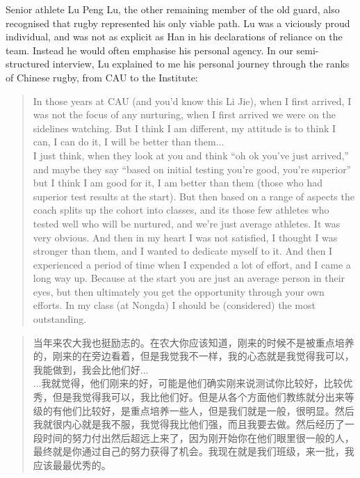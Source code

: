 \begin{CJK}{UTF8}{gbsn}
Senior athlete Lu Peng Lu, the other remaining member of the old guard, also recognised that rugby represented his only viable path. Lu was a viciously proud individual, and was not as explicit as Han in his declarations of reliance on the team. Instead he would often emphasise his personal agency.  In our semi-structured interview, Lu explained to me his personal journey through the ranks of Chinese rugby, from CAU to the Institute:

\begin{quotation}
    In those years at CAU (and you’d know this Li Jie), when I first arrived, I was not the focus of any nurturing, when I first arrived we were on the sidelines watching.  But I think I am different, my attitude is to think I can, I can do it, I will be better than them...\\

    I just think, when they look at you and think ``oh ok you’ve just arrived,'' and maybe they say ``based on initial testing you’re good, you’re superior'' but I think I am good for it, I am better than them (those who had superior test results at the start).  But then based on a range of aspects the coach splits up the cohort into classes, and its those few athletes who tested well who will be nurtured, and we’re just average athletes. It was very obvious. And then in my heart I was not satisfied, I thought I was stronger than them, and I wanted to dedicate myself to it.  And then I experienced a period of time when I expended a lot of effort, and I came a long way up.  Because at the start you are just an average person in their eyes, but then ultimately you get the opportunity through your own efforts. In my class (at Nongda) I should be (considered) the most outstanding.
\end{quotation}

    \begin{quotation}
    当年来农大我也挺励志的。在农大你应该知道，刚来的时候不是被重点培养的，刚来的在旁边看着，但是我觉我不一样，我的心态就是我觉得我可以，我能做到，我会比他们好...\\

    ...我就觉得，他们刚来的好，可能是他们确实刚来说测试你比较好，比较优秀，但是我觉得我可以，我比他们好。但是从各个方面他们教练就分出来等级的有他们比较好，是重点培养一些人，但是我们就是一般，很明显。然后我就很内心就是我不服，我觉得我比他们强，而且我要去做。然后经历了一段时间的努力付出然后超远上来了，因为刚开始你在他们眼里很一般的人，最终就是你通过自己的努力获得了机会。我现在就是我们班级，来一批，我应该最最优秀的。
    \end{quotation}


\end{CJK}
